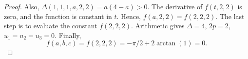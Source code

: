 \begin{proof}
Also, $\Delta(1,1,1,a,2,2) = a(4-a)>0$.  The derivative of $f(t,2,2)$ is zero,
and the function is constant in $t$.  Hence,  $f(a,2,2) = f(2,2,2)$.
The last step is to evaluate the constant $f(2,2,2)$.  Arithmetic gives
$\Delta=4$, $2p= 2$,  $u_1=u_2=u_3 =0$.   Finally,
    $$f(a,b,c)= f(2,2,2) = -\pi/2 + 2\arctan(1) =0.$$
\end{proof}
%






%
%
%
%
%
%
%
%

